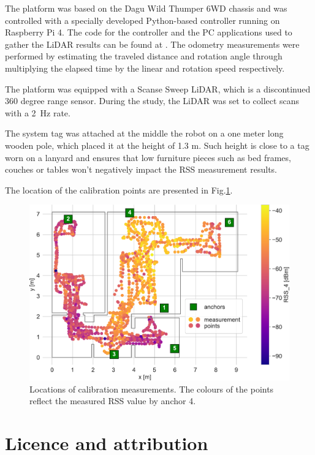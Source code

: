 \documentclass[conference]{IEEEtran}
\begin{document}
The platform was based on the Dagu Wild Thumper 6WD chassis and was controlled with a specially developed Python-based controller running on Raspberry Pi 4. The code for the controller and the PC applications used to gather the LiDAR results can be found at \cite{b2}.  The odometry measurements were performed by estimating the traveled distance and rotation angle through multiplying the elapsed time by the linear and rotation speed respectively.

The platform was equipped with a Scanse Sweep LiDAR, which is a discontinued 360 degree range sensor. During the study, the LiDAR was set to collect scans with a 2~Hz rate.

The system tag was attached at the middle the robot on a one meter long wooden pole, which placed it at the height of 1.3 m. Such height is close to a tag worn on a lanyard and ensures that low furniture pieces such as bed frames, couches or tables won't negatively impact the RSS measurement results.

The location of the calibration points are presented in Fig.\ref{fig:calibration}.

\begin{figure}[h]
\centering
\includegraphics[width=\columnwidth]{figs/measurement_points}
\caption{\label{fig:calibration}Locations of calibration measurements. The colours of the points reflect the measured RSS value by anchor 4.}
\end{figure}


\section{Licence and attribution}
\end{document}
